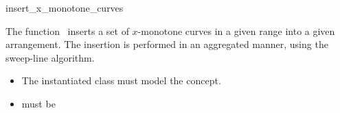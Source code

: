 \ccRefPageBegin

\begin{ccRefFunction}{insert_x_monotone_curves}

\ccDefinition

The function \ccRefName\ inserts a set of $x$-monotone curves in a given
range into a given arrangement. The insertion is performed in an aggregated
manner, using the sweep-line algorithm.



\ccRequirements
\begin{itemize}
\item The instantiated  class must model the
   concept.
\item {} must be 
\end{itemize}

\end{ccRefFunction}

\ccRefPageEnd
